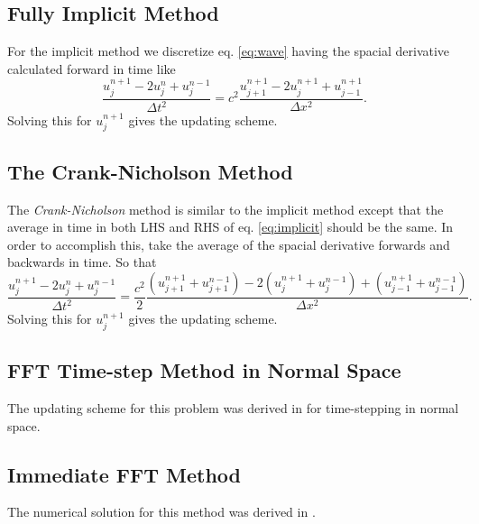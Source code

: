 \subsection{Fully Implicit Method}\label{sec:implicit}
For the implicit method we discretize eq. \eqref{eq:wave} having the spacial derivative calculated forward in time like
\begin{equation}\label{eq:implicit}
\frac{u_{j}^{n+1} - 2 u_{j}^{n} + u_{j}^{n-1}}{\Delta t^2} = c^2 \frac{u_{j+1}^{n+1} - 2 u_{j}^{n+1} + u_{j-1}^{n+1}}{\Delta x^2}.
\end{equation}
Solving this for $u_{j}^{n+1}$ gives the updating scheme.


\subsection{The Crank-Nicholson Method}\label{sec:crank}
The \emph{Crank-Nicholson} method is similar to the implicit method except that the average in time in both LHS and RHS of eq. \eqref{eq:implicit} should be the same. In order to accomplish this, take the average of the spacial derivative forwards and backwards in time. So that 
\begin{equation}\label{eq:crank}
\frac{u_{j}^{n+1} - 2 u_{j}^{n} + u_{j}^{n-1}}{\Delta t^2} = \frac{c^2}{2} 
\frac{(u_{j+1}^{n+1}+u_{j+1}^{n-1}) - 2 (u_{j}^{n+1}+u_{j}^{n-1}) + (u_{j-1}^{n+1}+u_{j-1}^{n-1})}{\Delta x^2}.
\end{equation}
Solving this for $u_{j}^{n+1}$ gives the updating scheme.


\subsection{FFT Time-step Method in Normal Space}\label{sec:ffttime}
The updating scheme for this problem was derived in \cite{FDNotes} for time-stepping in 
normal space.

\subsection{Immediate FFT Method}\label{sec:fftimm}
The numerical solution for this method was derived in \cite{FDNotes}.





